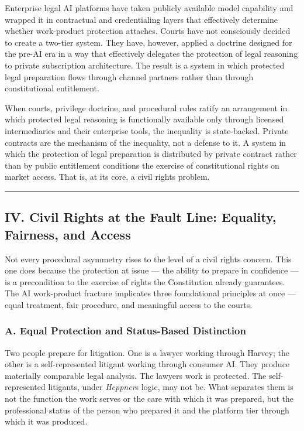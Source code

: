 \documentclass[
  12pt,
]{article}
\begin{document}
Enterprise legal AI platforms have taken publicly available model
capability and wrapped it in contractual and credentialing layers that
effectively determine whether work-product protection attaches. Courts
have not consciously decided to create a two-tier system. They have,
however, applied a doctrine designed for the pre-AI era in a way that
effectively delegates the protection of legal reasoning to private
subscription architecture. The result is a system in which protected
legal preparation flows through channel partners rather than through
constitutional entitlement.

When courts, privilege doctrine, and procedural rules ratify an
arrangement in which protected legal reasoning is functionally available
only through licensed intermediaries and their enterprise tools, the
inequality is state-backed. Private contracts are the mechanism of the
inequality, not a defense to it. A system in which the protection of
legal preparation is distributed by private contract rather than by
public entitlement conditions the exercise of constitutional rights on
market access. That is, at its core, a civil rights problem.

\begin{center}\rule{0.5\linewidth}{0.5pt}\end{center}

\subsection{IV. Civil Rights at the Fault Line: Equality, Fairness, and
Access}\label{iv-civil-rights-at-the-fault-line-equality-fairness-and-access}

Not every procedural asymmetry rises to the level of a civil rights
concern. This one does because the protection at issue --- the ability
to prepare in confidence --- is a precondition to the exercise of rights
the Constitution already guarantees. The AI
work-product fracture implicates three foundational principles at once
--- equal treatment, fair procedure, and meaningful access to the
courts.

\subsubsection{A. Equal Protection and Status-Based
Distinction}\label{a-equal-protection-and-status-based-distinction}

Two people prepare for litigation. One is a lawyer working through
Harvey; the other is a self-represented litigant working through
consumer AI. They produce materially comparable legal analysis. The
lawyer\textquotesingle s work is protected. The self-represented
litigant\textquotesingle s, under \emph{Heppner}\textquotesingle s
logic, may not be. What separates them is not the function the work
serves or the care with which it was prepared, but the professional
status of the person who prepared it and the platform tier through which
it was produced.
\end{document}
